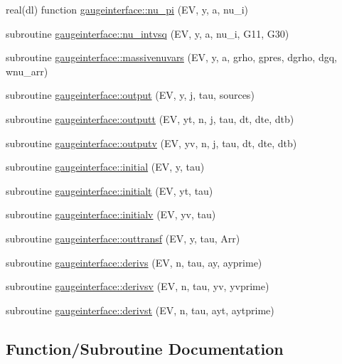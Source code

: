 \begin{DoxyCompactItemize}
\item 
real(dl) function \mbox{\hyperlink{namespacegaugeinterface_a33373e2888fd46e2c443d7e8c2785639}{gaugeinterface\+::nu\+\_\+pi}} (EV, y, a, nu\+\_\+i)
\item 
subroutine \mbox{\hyperlink{namespacegaugeinterface_a2e8822823d298cb0912b5ec22ea4a6ff}{gaugeinterface\+::nu\+\_\+intvsq}} (EV, y, a, nu\+\_\+i, G11, G30)
\item 
subroutine \mbox{\hyperlink{namespacegaugeinterface_ae4228ed9cfb9382025eb84617b0ed091}{gaugeinterface\+::massivenuvars}} (EV, y, a, grho, gpres, dgrho, dgq, wnu\+\_\+arr)
\item 
subroutine \mbox{\hyperlink{namespacegaugeinterface_ac370c67bc9750bf5749a69531fe3ffc1}{gaugeinterface\+::output}} (EV, y, j, tau, sources)
\item 
subroutine \mbox{\hyperlink{namespacegaugeinterface_a5235d59ec77fa4b3a41d9754c8e447ca}{gaugeinterface\+::outputt}} (EV, yt, n, j, tau, dt, dte, dtb)
\item 
subroutine \mbox{\hyperlink{namespacegaugeinterface_ad9126befa5df67da981345f6230fede4}{gaugeinterface\+::outputv}} (EV, yv, n, j, tau, dt, dte, dtb)
\item 
subroutine \mbox{\hyperlink{namespacegaugeinterface_aa05aaad2bec1907778ea8eae3a7ba521}{gaugeinterface\+::initial}} (EV, y, tau)
\item 
subroutine \mbox{\hyperlink{namespacegaugeinterface_afbc0a211756e4b923725483b6c961e75}{gaugeinterface\+::initialt}} (EV, yt, tau)
\item 
subroutine \mbox{\hyperlink{namespacegaugeinterface_aeed464df3ecab21d57bcb789fe3b1a22}{gaugeinterface\+::initialv}} (EV, yv, tau)
\item 
subroutine \mbox{\hyperlink{namespacegaugeinterface_ae920635485c908177072c6cad0d49f59}{gaugeinterface\+::outtransf}} (EV, y, tau, Arr)
\item 
subroutine \mbox{\hyperlink{namespacegaugeinterface_a1d317261c83f3b5e84fe401ac2436d44}{gaugeinterface\+::derivs}} (EV, n, tau, ay, ayprime)
\item 
subroutine \mbox{\hyperlink{namespacegaugeinterface_a25ee0c9e055aabce6b7eb205e65f9804}{gaugeinterface\+::derivsv}} (EV, n, tau, yv, yvprime)
\item 
subroutine \mbox{\hyperlink{namespacegaugeinterface_ab2ff4cd74364457862a7ff44fb2ca978}{gaugeinterface\+::derivst}} (EV, n, tau, ayt, aytprime)
\end{DoxyCompactItemize}


\subsection{Function/\+Subroutine Documentation}
\mbox{\label{equations__bde__v3__original_8f90_a1c228811398a4401bb57d778911a13df}} 
